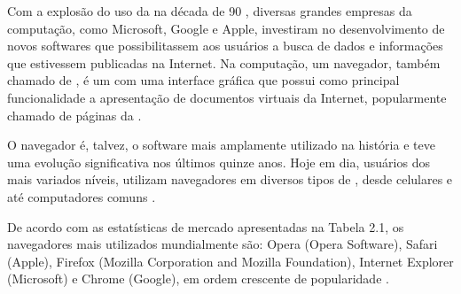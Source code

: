 \documentclass[espaco=simples,appendix=Name]{abnt}
\begin{document}
Com a explosão do uso da  na década de 90 \cite{BloombergGameChangers}, diversas grandes empresas da computação, como Microsoft, Google e Apple, investiram no desenvolvimento de novos softwares que possibilitassem aos usuários a busca de dados e informações que estivessem publicadas na Internet. Na computação, um navegador, também chamado de , é um  com uma interface gráfica que possui como principal funcionalidade a apresentação de documentos virtuais da Internet, popularmente chamado de páginas da .

O navegador é, talvez, o software mais amplamente utilizado na história e teve uma evolução significativa nos últimos quinze anos. Hoje em dia, usuários dos mais variados níveis, utilizam navegadores em diversos tipos de , desde celulares e  até computadores comuns \cite{ArchitectureWebBrowsers}.

De acordo com as estatísticas de mercado apresentadas na Tabela 2.1, os navegadores mais utilizados mundialmente são: Opera (Opera Software), Safari (Apple), Firefox (Mozilla Corporation and Mozilla Foundation), Internet Explorer (Microsoft) e Chrome (Google), em ordem crescente de popularidade \cite{BrowserStats}.
\end{document}
